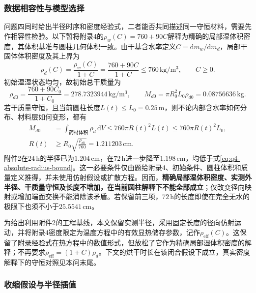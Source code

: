 \documentclass[withoutpreface,bwprint]{cumcmthesis}
\begin{document}
\subsubsection{数据相容性与模型选择}
\label{sec:q4-compatibility}

问题四同时给出半径时序和密度经验式，二者能否共同描述同一守恒材料，需要先作相容性检验。以下暂将附录4的$\rho_w(C)=760+90C$解释为精确的局部湿体积密度，其体积基准与圆柱几何体积一致。由干基含水率定义$C=\mathrm dm_w/\mathrm dm_d$，局部干固体体积密度及其上界为
\begin{equation}
\rho_d(C)=\frac{\rho_w(C)}{1+C}
=\frac{760+90C}{1+C}\le760\,\mathrm{kg/m^3},
\qquad C\ge0.
\label{eq:q4-true-dry-density-bound}
\end{equation}
初始温湿状态均匀，故初始总干质量为
\begin{equation}
\rho_{d0}=\frac{760+90C_0}{1+C_0}=278.7323944\,\mathrm{kg/m^3},
\qquad
M_{d0}=\pi R_0^2L_0\rho_{d0}=0.08756636\,\mathrm{kg}.
\label{eq:q4-initial-dry-mass}
\end{equation}
若干质量守恒，且当前圆柱长度$L(t)\le L_0=0.25\,\mathrm m$，则不论内部含水率如何分布、材料层如何变形，都有
\begin{equation}
\begin{aligned}
M_{d0}&=\int_{\text{药材体积}}\rho_d\,\mathrm dV
\le760\pi R(t)^2L(t)\le760\pi R(t)^2L_0,\\
R(t)&\ge R_0\sqrt{\frac{\rho_{d0}}{760}}
=1.211203\,\mathrm{cm}.
\end{aligned}
\label{eq:q4-absolute-radius-bound}
\end{equation}
附件2在$24\,\mathrm h$的半径已为$1.204\,\mathrm{cm}$，在$72\,\mathrm h$进一步降至$1.198\,\mathrm{cm}$，均低于式\eqref{eq:q4-absolute-radius-bound}。这一必要条件仅由题给附录4、初始条件、圆柱体积和质量定义推得，并未使用仿射假设或扩散方程。因而，\textbf{精确局部湿体积密度、实测外半径、干质量守恒及长度不增加，在当前圆柱解释下不能全部成立}；仅改变径向映射或增加端面交换不能消除该矛盾。若保留前三项，$72\,\mathrm h$的长度即使在完全无水的极限下也须不小于$25.5541\,\mathrm{cm}$。

为给出利用附件2的工程基线，本文保留实测半径，采用固定长度的径向仿射运动，并将附录4密度限定为温度方程中的有效显热储存参数，记作$\rho_{\mathrm{eff}}(C)$。这保留了附录经验式在热方程中的数值形式，但放松了它作为精确局部湿体积密度的解释；不再要求$\rho_{\mathrm{eff}}=(1+C)\rho_d$。下文的烘干时长在该闭合假设下成立，真实密度解释下的守恒对照见本问末尾。

\subsubsection{收缩假设与半径插值}
\end{document}
